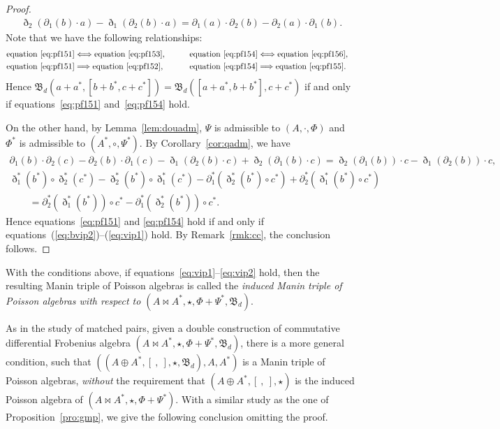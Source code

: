 \documentclass[pdftex]{sigma}
\numberwithin{equation}{section}
\begin{document}
\begin{proof}
\begin{gather}
 \eth_2(\partial_1(b) \cdot a) - \eth_1(\partial_2(b) \cdot a) = \partial_1(a) \cdot \partial_2(b) - \partial_2(a) \cdot \partial_1(b). \label{eq:pf156}
 \end{gather}
 Note that we have the following relationships:
 \begin{alignat*}{3}
 &{\rm equation~\eqref{eq:pf151}} \Longleftrightarrow {\rm equation~\eqref{eq:pf153}}, \qquad&&
 {\rm equation~\eqref{eq:pf154}} \Longleftrightarrow {\rm equation~\eqref{eq:pf156}}, &\\
 &{\rm equation~\eqref{eq:pf151}} \Longrightarrow {\rm equation~\eqref{eq:pf152}}, \qquad&&
 {\rm equation~\eqref{eq:pf154}} \Longrightarrow {\rm equation~\eqref{eq:pf155}}.&
 \end{alignat*}
 Hence $\mathfrak{B}_d(a + a^*, [b + b^*, c + c^*]) = \mathfrak{B}_d([a + a^*, b + b^*], c + c^*)$ if and only if equations~\eqref{eq:pf151} and~\eqref{eq:pf154} hold.

 On the other hand, by Lemma~\ref{lem:douadm},
 $\Psi$ is admissible to $(A, \cdot, \Phi)$ and $\Phi^*$ is admissible to $(A^*, \circ, \Psi^*)$.
 By Corollary~\ref{cor:qadm}, we have
 \begin{gather*}
 \partial_1(b) \cdot \partial_2(c) - \partial_2(b) \cdot \partial_1(c) - \eth_1(\partial_2(b) \cdot c) + \eth_2(\partial_1(b) \cdot c) = \eth_2(\partial_1(b)) \cdot c - \eth_1(\partial_2(b)) \cdot c,\\
 \eth_1^{*}(b^*) \circ \eth_2^{*}(c^*) - \eth_2^{*}(b^*) \circ \eth_1^{*}(c^*) - \partial_1^{*}(\eth_2^{*}(b^*) \circ c^*) + \partial_2^{*}(\eth_1^{*}(b^*) \circ c^*) \\
 \qquad{} = \partial_2^*(\eth_1^*(b^*)) \circ c^* - \partial_1^*(\eth_2^*(b^*)) \circ c^*.
 \end{gather*}
 Hence equations~\eqref{eq:pf151} and \eqref{eq:pf154} hold if and only if equations~(\ref{eq:bvip2})--(\ref{eq:vip1}) hold.
 By Remark~\ref{rmk:cc}, the conclusion follows.
\end{proof}

With the conditions above, if equations~\eqref{eq:vip1}--\eqref{eq:vip2} hold, then the resulting Manin triple of Poisson algebras is called the \textit{induced Manin triple of Poisson algebras with respect to $(A \bowtie A^*, \star, \Phi + \Psi^*, \mathfrak{B}_d)$}.

As in the study of matched pairs, given a double construction of commutative differential Frobenius algebra $(A \bowtie A^*, \star, \Phi + \Psi^*, \mathfrak{B}_d)$,
there is a more general condition, such that $((A \oplus A^*,\allowbreak [\ ,\ ], \star, \mathfrak{B}_d), A, A^*)$ is a Manin triple of Poisson algebras,
\textit{without} the requirement that $(A \oplus A^*,\allowbreak [\ ,\ ], \star)$ is the induced Poisson algebra of $(A \bowtie A^*, \star, \Phi + \Psi^*)$.
With a similar study as the one of Proposition~\ref{pro:gmp}, we give the following conclusion omitting the proof.
\end{document}
